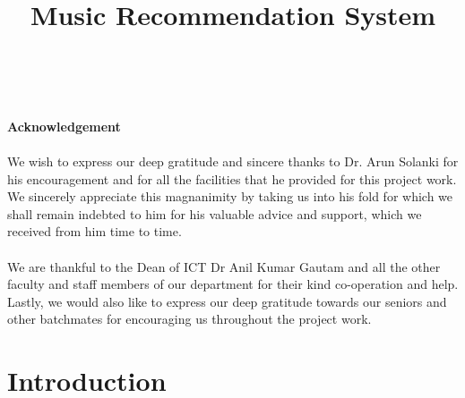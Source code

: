 \documentclass[paper=a4, fontsize=12pt]{scrartcl}
\title{
		\usefont{OT1}{bch}{b}{n}
		\horrule{0.5pt} \\[0.4cm]
		\huge Music Recommendation System \\
		\horrule{2pt} \\[0.5cm]
}
\numberwithin{equation}{section}		%
\numberwithin{figure}{section}			%
\numberwithin{table}{section}				%
\begin{document}
\tableofcontents

\pagebreak

\textbf{\large Acknowledgement}
\\
\\
We wish to express our deep gratitude and sincere thanks to Dr. Arun Solanki for his encouragement and for all the facilities that he provided for this project work. We sincerely appreciate this magnanimity by taking us into his fold for which we shall remain indebted to him for his valuable advice and support, which we received from him time to time.
\\
\\
We are thankful to the Dean of ICT Dr Anil Kumar Gautam and all the other faculty and staff members of our department for their kind co-operation and help. Lastly, we would also like to express our deep gratitude towards our seniors and other batchmates for encouraging us throughout the project work.
\pagebreak

\section{Introduction}
\end{document}
